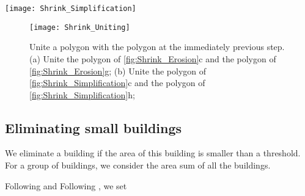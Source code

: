 \begin{figure*}[tb]
	\centering
	\texttt{[image: Shrink\_Simplification]}
	\caption{A building shrinks during growing because of line simplification, 
		where $t_1=0.7$, $t_2=0.8$, and $t_3=1$.
		The small gray polygons represent the original building.
		The process for (a), (b), and (c), and 
		the process for (e), (f), and (g) are the same as 
		the processes in \fig\ref{fig:Shrink_Erosion}.
		(d) The large gray polygon is the target shape on goal map.
		(h) Simplify the polygon in (g) using the Imai--Iri algorithm.
		Note that $d_{l,t_1}<d_{l,t_2}$ see \eq\ref{eq:d_lt}),
		which is why the Imai--Iri algorithm does not 
		remove any point of the polygon in (c),
		but removes two points of the polygon in (g).
		The darker gray pieces in (h) show 
		the parts which are included in the polygon of (c), 
		but not in the polygon of (h).
	}
	\label{fig:Shrink_Simplification}
\end{figure*}

\begin{figure}[tb]
	\centering
	\texttt{[image: Shrink\_Uniting]}
	\caption{Unite a polygon with the polygon at the immediately previous step.
		(a) Unite the polygon of \fig\ref{fig:Shrink_Erosion}c and the 
		polygon of \fig\ref{fig:Shrink_Erosion}g;
		(b) Unite the polygon of \fig\ref{fig:Shrink_Simplification}c and 
		the polygon of \fig\ref{fig:Shrink_Simplification}h;
	}
	\label{fig:Shrink_Uniting}
\end{figure}




\subsection{Eliminating small buildings}
\label{sec:Eliminate}
We eliminate a building if the area of this building is smaller than a 
threshold.
For a group of buildings, we consider the area sum of all the buildings.

Following \citet{Stoter2009} and Following \citet{Chaudhry2008}, 
we set 

